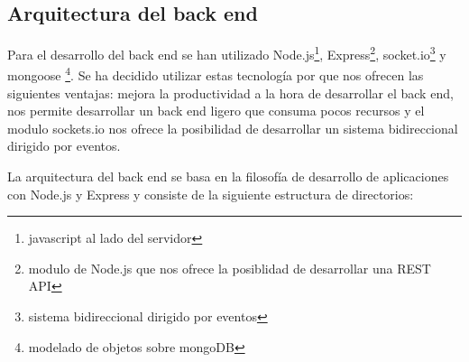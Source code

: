 \subsection{Arquitectura del back end}
\thispagestyle{empty}

Para el desarrollo del back end se han utilizado Node.js\footnote{javascript al lado del servidor}, Express\footnote{modulo de Node.js que nos ofrece la posiblidad de desarrollar una REST API}, socket.io\footnote{sistema bidireccional dirigido por eventos} y mongoose \footnote{modelado de objetos sobre mongoDB}. Se ha decidido utilizar estas tecnología por que nos ofrecen las siguientes ventajas: mejora la productividad a la hora de desarrollar el back end, nos permite desarrollar un back end ligero que consuma pocos recursos y el modulo sockets.io nos ofrece la posibilidad de desarrollar un sistema bidireccional dirigido por eventos.

La arquitectura del back end se basa en la filosofía de desarrollo de aplicaciones con Node.js y Express y consiste de la siguiente estructura de directorios:


\newpage

